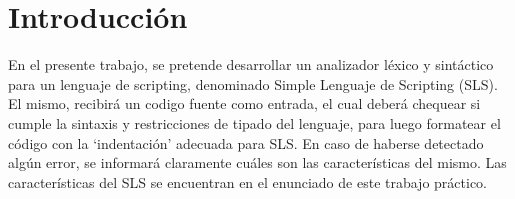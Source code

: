 \section{Introducción}

En el presente trabajo, se pretende desarrollar un analizador léxico y sintáctico para un lenguaje de scripting, denominado Simple Lenguaje de Scripting (SLS). El mismo, recibirá un codigo fuente como entrada, el cual deberá chequear si cumple la sintaxis y restricciones de tipado del lenguaje, para luego formatear el código con la ‘indentación’ adecuada para SLS. En caso de haberse detectado algún error, se informará claramente cuáles son las características del mismo.
Las características del SLS se encuentran en el enunciado de este trabajo práctico.
